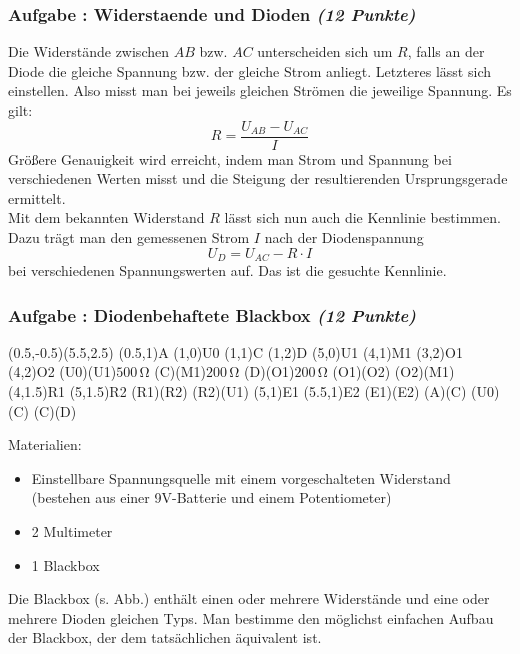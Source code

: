 \documentclass[12pt,a4paper]{article}
\newcommand{\unit}[1]{\,\mathrm{#1}}
\newcommand{\skizze}[1]{
\begin{center}
#1
\end{center}
}
\newcounter{numlabel}
\newenvironment{problem}[2]{\stepcounter{numlabel} \vspace{1ex} \subsubsection*{Aufgabe \the\value{numlabel}: #1 \emph{(#2 Punkte)}} \renewcommand{\Currentlabel}{Aufgabe \the\value{numlabel}: #1}}{

}
\begin{document}
\begin{problem}{Widerstaende und Dioden}{12}
\begin{expsolution}
Die Widerstände zwischen $AB$ bzw. $AC$ unterscheiden sich um $R$, falls an der Diode die gleiche Spannung bzw. der gleiche Strom anliegt. Letzteres lässt sich einstellen. Also misst man bei jeweils gleichen Strömen die jeweilige Spannung. Es gilt:
\[
 R = \frac{U_{AB}-U_{AC}}{I}
\]
Größere Genauigkeit wird erreicht, indem man Strom und Spannung bei verschiedenen Werten misst und die Steigung der resultierenden Ursprungsgerade ermittelt.\\

Mit dem bekannten Widerstand $R$ lässt sich nun auch die Kennlinie bestimmen. Dazu trägt man den gemessenen Strom $I$ nach der Diodenspannung
\[
 U_D = U_{AC} -R\cdot I
\]
bei verschiedenen Spannungswerten auf. Das ist die gesuchte Kennlinie.
\end{expsolution}
\end{problem}



\begin{problem}{Diodenbehaftete Blackbox}{12}
\skizze{
\begin{pspicture}(0.5,-0.5)(5.5,2.5)
 \pnode(0.5,1){A}
 \pnode(1,0){U0}
 \pnode(1,1){C}
 \pnode(1,2){D}
 \pnode(5,0){U1}
 \pnode(4,1){M1}
\pnode(3,2){O1}
\pnode(4,2){O2}
\resistor[labeloffset=0](U0)(U1){$500 \unit{\Omega}$}
\resistor[labeloffset=0](C)(M1){$200 \unit{\Omega}$}
\resistor[labeloffset=0](D)(O1){$200 \unit{\Omega}$}
\diode(O1)(O2){}
\wire(O2)(M1)
\pnode(4,1.5){R1}
\pnode(5,1.5){R2}
\diode(R1)(R2){}
\wire(R2)(U1)
\pnode(5,1){E1}
\pnode(5.5,1){E2}
\wire(E1)(E2)
 \wire(A)(C)
 \wire(U0)(C)
 \wire(C)(D)
\end{pspicture}
}
Materialien:
\begin{itemize}
\item Einstellbare Spannungsquelle mit einem vorgeschalteten Widerstand (bestehen aus einer 9V-Batterie und einem Potentiometer)
\item 2 Multimeter
\item 1 Blackbox
\end{itemize}
Die Blackbox (s. Abb.) enthält einen oder mehrere Widerstände und eine oder mehrere Dioden gleichen Typs. Man bestimme den möglichst einfachen Aufbau der Blackbox, der dem tatsächlichen äquivalent ist.
% 
\end{problem}
\end{document}
